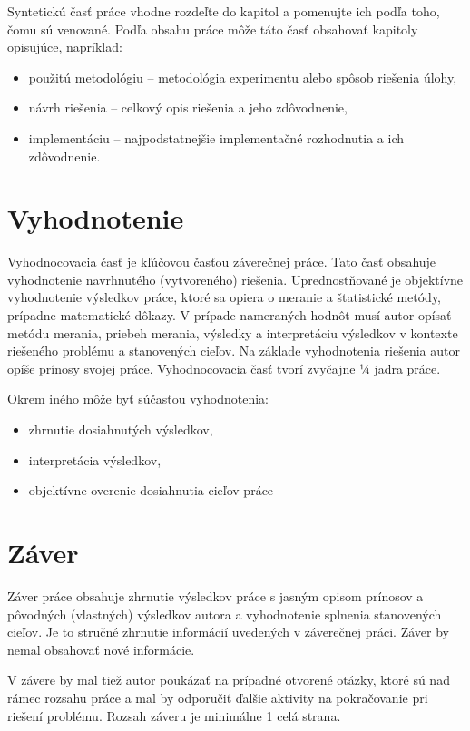 Syntetickú časť práce vhodne rozdeľte do kapitol a pomenujte ich podľa toho, čomu sú venované. Podľa obsahu práce môže táto časť obsahovať kapitoly opisujúce, napríklad:

\begin{itemize}
  \item použitú metodológiu -- metodológia experimentu alebo spôsob riešenia úlohy,
  \item návrh riešenia -- celkový opis riešenia a jeho zdôvodnenie,
  \item implementáciu -- najpodstatnejšie implementačné rozhodnutia a ich zdôvodnenie.
\end{itemize}


\section*{Vyhodnotenie}

Vyhodnocovacia časť je kľúčovou časťou záverečnej práce. Tato časť obsahuje vyhodnotenie navrhnutého (vytvoreného) riešenia. Uprednostňované je objektívne vyhodnotenie výsledkov práce, ktoré sa opiera o meranie a štatistické metódy, prípadne matematické dôkazy. V prípade nameraných hodnôt musí autor opísať metódu merania, priebeh merania, výsledky a interpretáciu výsledkov v kontexte riešeného problému a stanovených cieľov. Na základe vyhodnotenia riešenia autor opíše prínosy svojej práce. Vyhodnocovacia časť tvorí zvyčajne ¼ jadra práce.

Okrem iného môže byť súčasťou vyhodnotenia:
\begin{itemize}
  \item zhrnutie dosiahnutých výsledkov,
  \item interpretácia výsledkov,
  \item objektívne overenie dosiahnutia cieľov práce
\end{itemize}


\section*{Záver}

Záver práce obsahuje zhrnutie výsledkov práce s jasným opisom prínosov a pôvodných (vlastných) výsledkov autora a vyhodnotenie splnenia stanovených cieľov. Je to stručné zhrnutie informácií uvedených v záverečnej práci. Záver by nemal obsahovať nové informácie.

V závere by mal tiež autor poukázať na prípadné otvorené otázky, ktoré sú nad rámec rozsahu práce a mal by odporučiť ďalšie aktivity na pokračovanie pri riešení problému. Rozsah záveru je minimálne 1 celá strana.


